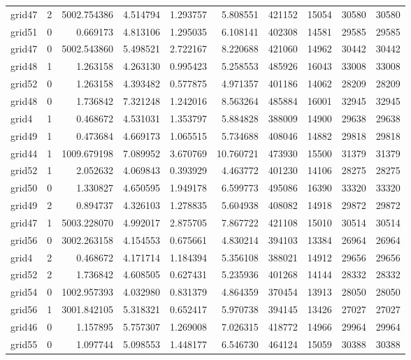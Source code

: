\begin{longtable}{|l|r|r|r|r|r|r|r|r|r|}
grid47 & 2 & 5002.754386 & 4.514794 & 1.293757 & 5.808551 & 421152 & 15054 & 30580 & 30580 \\
grid51 & 0 & 0.669173 & 4.813106 & 1.295035 & 6.108141 & 402308 & 14581 & 29585 & 29585 \\
grid47 & 0 & 5002.543860 & 5.498521 & 2.722167 & 8.220688 & 421060 & 14962 & 30442 & 30442 \\
grid48 & 1 & 1.263158 & 4.263130 & 0.995423 & 5.258553 & 485926 & 16043 & 33008 & 33008 \\
grid52 & 0 & 1.263158 & 4.393482 & 0.577875 & 4.971357 & 401186 & 14062 & 28209 & 28209 \\
grid48 & 0 & 1.736842 & 7.321248 & 1.242016 & 8.563264 & 485884 & 16001 & 32945 & 32945 \\
grid4 & 1 & 0.468672 & 4.531031 & 1.353797 & 5.884828 & 388009 & 14900 & 29638 & 29638 \\
grid49 & 1 & 0.473684 & 4.669173 & 1.065515 & 5.734688 & 408046 & 14882 & 29818 & 29818 \\
grid44 & 1 & 1009.679198 & 7.089952 & 3.670769 & 10.760721 & 473930 & 15500 & 31379 & 31379 \\
grid52 & 1 & 2.052632 & 4.069843 & 0.393929 & 4.463772 & 401230 & 14106 & 28275 & 28275 \\
grid50 & 0 & 1.330827 & 4.650595 & 1.949178 & 6.599773 & 495086 & 16390 & 33320 & 33320 \\
grid49 & 2 & 0.894737 & 4.326103 & 1.278835 & 5.604938 & 408082 & 14918 & 29872 & 29872 \\
grid47 & 1 & 5003.228070 & 4.992017 & 2.875705 & 7.867722 & 421108 & 15010 & 30514 & 30514 \\
grid56 & 0 & 3002.263158 & 4.154553 & 0.675661 & 4.830214 & 394103 & 13384 & 26964 & 26964 \\
grid4 & 2 & 0.468672 & 4.171714 & 1.184394 & 5.356108 & 388021 & 14912 & 29656 & 29656 \\
grid52 & 2 & 1.736842 & 4.608505 & 0.627431 & 5.235936 & 401268 & 14144 & 28332 & 28332 \\
grid54 & 0 & 1002.957393 & 4.032980 & 0.831379 & 4.864359 & 370454 & 13913 & 28050 & 28050 \\
grid56 & 1 & 3001.842105 & 5.318321 & 0.652417 & 5.970738 & 394145 & 13426 & 27027 & 27027 \\
grid46 & 0 & 1.157895 & 5.757307 & 1.269008 & 7.026315 & 418772 & 14966 & 29964 & 29964 \\
grid55 & 0 & 1.097744 & 5.098553 & 1.448177 & 6.546730 & 464124 & 15059 & 30388 & 30388 \\

\end{longtable}
